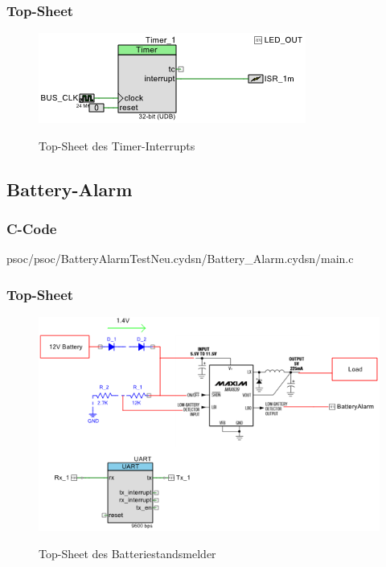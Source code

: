 \documentclass[12pt,a4paper,german]{article}
\begin{document}
\subsubsection{Top-Sheet}
	 
 \begin{figure}[H]
	\centering
	\includegraphics[width=\textwidth]{pictures/topsch_timer_int.png}
	\label{fig:topsch_timer_int}
	\caption{Top-Sheet des Timer-Interrupts}
\end{figure}

	
\subsection{Battery-Alarm}

\subsubsection{C-Code}


	{psoc/psoc/BatteryAlarmTestNeu.cydsn/Battery_Alarm.cydsn/main.c}

\subsubsection{Top-Sheet}
	 
 \begin{figure}[H]
	\centering
	\includegraphics[width=\textwidth]{pictures/topsch_battery.png}
	\label{fig:topsch_batter}
	\caption{Top-Sheet des Batteriestandsmelder}
\end{figure}
\end{document}
